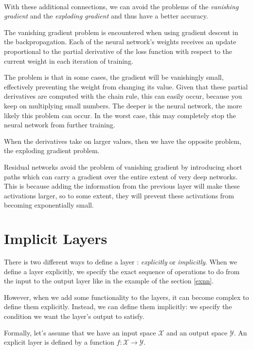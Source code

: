 \documentclass[10pt,a4paper]{article}
\theoremstyle{definition}
\theoremstyle{definition}
\theoremstyle{definition}
\begin{document}
~

With these additional connections, we can avoid the problems of the \textit{vanishing gradient} and the \textit{exploding gradient} and thus have a better accuracy. 

The vanishing gradient problem is encountered when using gradient descent in the backpropagation. Each of the neural network's weights receives an update proportional to the partial derivative of the loss function with respect to the current weight in each iteration of training. 

The problem is that in some cases, the gradient will be vanishingly small, effectively preventing the weight from changing its value. Given that these partial derivatives are computed with the chain rule, this can easily occur, because you keep on multiplying small numbers. The deeper is the neural network, the more likely this problem can occur. In the worst case, this may completely stop the neural network from further training. 

When the derivatives take on larger values, then we have the opposite problem, the exploding gradient problem.

Residual networks avoid the problem of vanishing gradient by introducing short paths which can carry a gradient over the entire extent of very deep networks. This is because adding the information from the previous layer will make these activations larger, so to some extent, they will prevent these activations from becoming exponentially small.


\section{Implicit Layers}

There is two different ways to define a layer : \textit{explicitly} or \textit{implicitly}. When we define a layer explicitly, we specify the exact sequence of operations to do from the input to the output layer like in the example of the section \ref{exnn}. 

However, when we add some functionality to the layers, it can become complex to define them explicitly. Instead, we can define them implicitly: we specify the condition we want the layer's output to satisfy. 

Formally, let's assume that we have an input space $\mathcal{X}$ and an output space $\mathcal{Y}$. An explicit layer is defined by a function $f : \mathcal{X} \rightarrow \mathcal{Y}$. 
\end{document}
